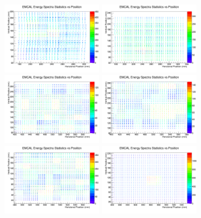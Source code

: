 \documentclass[hidelinks,11pt]{article}
\numberwithin{figure}{section}
\numberwithin{table}{section}
\begin{document}
\begin{figure}[hbtp]
\begin{center}
\includegraphics[width=0.38\textwidth]{Plots/StatPo/StatPo20172ndScan.png}
\includegraphics[width=0.38\textwidth]{Plots/StatPo/StatPo20173rdScan.png}
\includegraphics[width=0.38\textwidth]{Plots/StatPo/StatPo20183rdScan.png}
\includegraphics[width=0.38\textwidth]{Plots/StatPo/StatPo20184thScan.png}
\includegraphics[width=0.38\textwidth]{Plots/StatPo/StatPo20185thScan.png}
\includegraphics[width=0.38\textwidth]{Plots/StatPo/StatPo20186thScan.png}

\end{center}
\end{figure}
\end{document}
